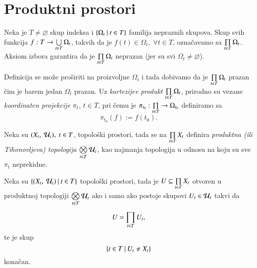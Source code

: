 
\chapter{Produktni prostori}

Neka je $T \neq \varnothing$ skup indeksa i $\{{\Omega_t} \: | \: {t \in T}\}$ familija nepraznih skupova.
Skup svih funkcija $f: T \to \bigcup\limits_{t \in T}^{} \Omega_t$, takvih da je $f(t) \in \Omega_t, \; \forall t \in T$, ozna\v cavamo sa $\prod\limits_{t \in T}^{} \Omega_t$.
Aksiom izbora garantira da je $\prod\limits_{t \in T}^{} \Omega_t$ neprazan (jer su svi $\Omega_t \neq \varnothing$).

Definicija se mo\v ze pro\v siriti na proizvoljne $\Omega_t$ i tada dobivamo da je $\prod\limits_{t \in T}^{} \Omega_t$ prazan  \v cim je barem jedan $\Omega_t$ prazan.
Uz \emph{kartezijev produkt} $\prod\limits_{t \in T}^{} \Omega_t$, prirodno su vezane \emph{koordinaten projekcije $\pi_t$}, $t \in T$, pri \v cemu je $\pi_{t_0}: \prod\limits_{t \in T}^{} \to \Omega_{t_0}$ definiramo sa
\begin{equation*}
    \pi_{t_0} (f) := f(t_0).
\end{equation*}

\begin{defn}    \label{defn:4.0-1}
    Neka su $(X_t, \: \mathcal{U}_t), \; t \in T$, topolo\v ski prostori, tada se na $\prod\limits_{t \in T}^{} X_t$ definira \emph{produktna (ili Tihonovljeva) topologija} $\bigotimes\limits_{t \in T}^{} \mathcal{U}_t$, kao najmanja topologija u odnosu na koju su sve $\pi_t$ neprekidne.
\end{defn}

\begin{tm}  \label{tm:4.0-2}
    Neka su $\{{({X_t}, \: {\mathcal{U}_t})} \: | \: {t \in T}\}$ topolo\v ski prostori, tada je $U \subseteq \prod\limits_{t \in T}^{} X_t$ otvoren u produktnoj topologiji $\bigotimes\limits_{t \in T}^{} \mathcal{U}_t$ ako i samo ako postoje skupovi $U_t \in \mathcal{U}_t$ takvi da
    \begin{equation*}
        U = \prod\limits_{t \in T}^{} U_t,
    \end{equation*}
    te je skup
    \begin{equation*}
        \{{t \in T} \: | \: {U_t \neq X_t}\}
    \end{equation*}
    kona\v can.
\end{tm}


